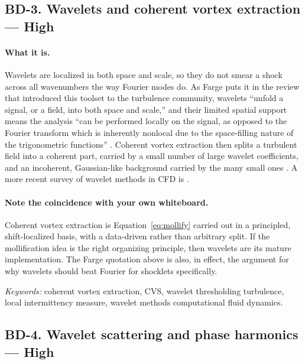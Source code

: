 \documentclass[11pt]{article}
\newcommand{\High}{\textbf{High}}
\newcommand{\keywords}[1]{\par\smallskip\noindent\textit{Keywords:} #1}
\begin{document}
\subsection{BD-3. Wavelets and coherent vortex extraction --- \High{}}

\paragraph{What it is.} Wavelets are localized in both space and scale, so they do not smear
a shock across all wavenumbers the way Fourier modes do. As Farge puts it in the review that
introduced this toolset to the turbulence community, wavelets ``unfold a signal, or a field,
into both space and scale,'' and their limited spatial support means the analysis ``can be
performed locally on the signal, as opposed to the Fourier transform which is inherently
nonlocal due to the space-filling nature of the trigonometric functions'' \cite{farge1992}.
Coherent vortex extraction then splits a turbulent field into a coherent part, carried by a
small number of large wavelet coefficients, and an incoherent, Gaussian-like background
carried by the many small ones \cite{fargeschneider1999,farge2001}. A more recent survey of
wavelet methods in CFD is \cite{schneidervasilyev2010}.

\paragraph{Note the coincidence with your own whiteboard.} Coherent vortex extraction is
Equation~\eqref{eq:mollify} carried out in a principled, shift-localized basis, with a
data-driven rather than arbitrary split. If the mollification idea is the right organizing
principle, then wavelets are its mature implementation. The Farge quotation above is also, in
effect, the argument for why wavelets should beat Fourier for shocklets specifically.

\keywords{coherent vortex extraction, CVS, wavelet thresholding turbulence, local
intermittency measure, wavelet methods computational fluid dynamics.}

\subsection{BD-4. Wavelet scattering and phase harmonics --- \High{}}
\end{document}
